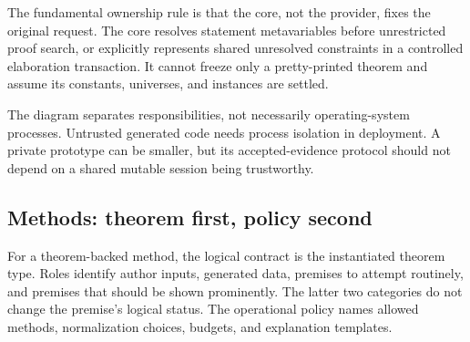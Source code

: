\documentclass[11pt,a4paper]{article}
\theoremstyle{remark}\newtheorem{example}[proposition]{Example}
\begin{document}
The fundamental ownership rule is that the core, not the provider, fixes the original request. The core resolves statement metavariables before unrestricted proof search, or explicitly represents shared unresolved constraints in a controlled elaboration transaction. It cannot freeze only a pretty-printed theorem and assume its constants, universes, and instances are settled.

\begin{center}
\end{center}
The diagram separates responsibilities, not necessarily operating-system processes. Untrusted generated code needs process isolation in deployment. A private prototype can be smaller, but its accepted-evidence protocol should not depend on a shared mutable session being trustworthy.

\subsection{Methods: theorem first, policy second}
For a theorem-backed method, the logical contract is the instantiated theorem type. Roles identify author inputs, generated data, premises to attempt routinely, and premises that should be shown prominently. The latter two categories do not change the premise's logical status. The operational policy names allowed methods, normalization choices, budgets, and explanation templates.
\end{document}
